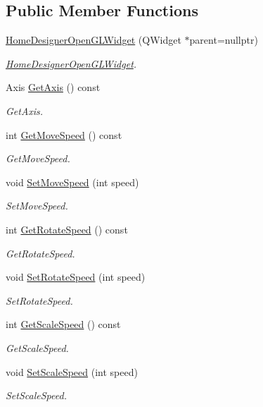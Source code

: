 \subsection*{Public Member Functions}
\begin{DoxyCompactItemize}
\item 
\hyperlink{class_home_designer_open_g_l_widget_a24232a9ac7981b4410a8fad3d3773ef5}{Home\+Designer\+Open\+G\+L\+Widget} (Q\+Widget $\ast$parent=nullptr)
\begin{DoxyCompactList}\small\item\em \hyperlink{class_home_designer_open_g_l_widget}{Home\+Designer\+Open\+G\+L\+Widget}. \end{DoxyCompactList}\item 
Axis \hyperlink{class_home_designer_open_g_l_widget_a9e4a4bfa55e86426d28ba0589035cec9}{Get\+Axis} () const 
\begin{DoxyCompactList}\small\item\em Get\+Axis. \end{DoxyCompactList}\item 
int \hyperlink{class_home_designer_open_g_l_widget_a766ed7c727cfbe473064fd244dede73d}{Get\+Move\+Speed} () const 
\begin{DoxyCompactList}\small\item\em Get\+Move\+Speed. \end{DoxyCompactList}\item 
void \hyperlink{class_home_designer_open_g_l_widget_a36605922069ae365da069207b97a058c}{Set\+Move\+Speed} (int speed)
\begin{DoxyCompactList}\small\item\em Set\+Move\+Speed. \end{DoxyCompactList}\item 
int \hyperlink{class_home_designer_open_g_l_widget_abdfd4baea7b439683ce0e87278335035}{Get\+Rotate\+Speed} () const 
\begin{DoxyCompactList}\small\item\em Get\+Rotate\+Speed. \end{DoxyCompactList}\item 
void \hyperlink{class_home_designer_open_g_l_widget_a8987eaba2c2dd6b0d5f1348c7a80db1c}{Set\+Rotate\+Speed} (int speed)
\begin{DoxyCompactList}\small\item\em Set\+Rotate\+Speed. \end{DoxyCompactList}\item 
int \hyperlink{class_home_designer_open_g_l_widget_a4eefb0e0be806ebd74ea6b13cfa941ee}{Get\+Scale\+Speed} () const 
\begin{DoxyCompactList}\small\item\em Get\+Scale\+Speed. \end{DoxyCompactList}\item 
void \hyperlink{class_home_designer_open_g_l_widget_a3bbe46ba314a8ef0a7a380fa7e8bbbdc}{Set\+Scale\+Speed} (int speed)
\begin{DoxyCompactList}\small\item\em Set\+Scale\+Speed. \end{DoxyCompactList}\end{DoxyCompactItemize}
